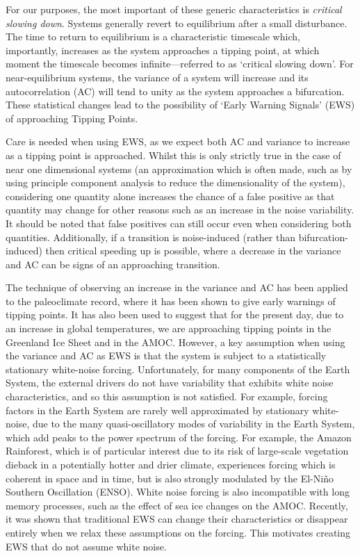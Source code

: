 For our purposes, the most important of these generic characteristics
is \emph{critical slowing down}. Systems generally revert to  equilibrium after a small disturbance. 
The time to return to equilibrium is a characteristic timescale which, importantly, increases as the system 
approaches a tipping point, at which moment the timescale becomes 
infinite\cite{Scheffer2012}---referred to as `critical slowing down'. 
For near-equilibrium systems, the variance of a system will increase and its autocorrelation (AC)
will tend to unity as the system approaches a bifurcation\cite{Scheffer2009,Held2004}.
These statistical changes lead to the possibility of `Early Warning Signals' (EWS) of approaching Tipping Points.

Care is needed when using EWS, as we 
expect both AC and variance to increase as a tipping point is 
approached\cite{Ditlevsen2010}. Whilst this is only strictly true
in the case of near one dimensional systems (an approximation which is often made, such as by using principle component analysis to reduce the 
dimensionality of the system\cite{Held2004}), considering one quantity alone 
increases the chance of a false positive as that quantity may change for other reasons such as an increase in the noise variability. It should 
be noted that false positives can still occur even when considering 
both quantities.
Additionally, if a transition is noise-induced (rather than bifurcation-induced) then critical speeding up is possible, where
a decrease in the variance and AC can be signs of an approaching transition\cite{Titus2020}.

The technique of observing an increase in the variance and
AC has been applied to the paleoclimate record, where it has been shown to give early
warnings of tipping points\cite{Boers2018a}. It has also been used to 
suggest that for the present day, due to an increase in global temperatures, we are approaching tipping points in 
the Greenland Ice Sheet\cite{Boers2021} and in the AMOC\cite{Boers2021a}.	
However, a key assumption when using the variance and AC as EWS is that the system is subject to a statistically stationary white-noise forcing. Unfortunately, for many
components of the Earth System, the external drivers do not have variability that exhibits white noise characteristics, and
so this assumption is not satisfied. For example, forcing factors in the Earth System are rarely well approximated by stationary white-noise, due to the many quasi-oscillatory modes
of variability in the Earth System\cite{VonderHeydt2021}, which add peaks
to the power spectrum of the forcing. For example, the Amazon
Rainforest, which is of particular interest due to its risk of large-scale vegetation dieback in a potentially hotter and drier
climate, experiences
forcing which is coherent in space and in time, but is also strongly modulated by the
El-Ni\~{n}o Southern Oscillation (ENSO)\cite{Jimenez-Munoz2016}.
White noise forcing is also incompatible with
long memory processes\cite{Hurst1957}, such as the effect of sea ice changes on the AMOC\cite{Kuehn2021}. Recently, it was shown\cite{Kuehn2021}
that traditional EWS  can change their characteristics or disappear entirely when we relax these assumptions on the forcing. This motivates creating EWS that do not assume white noise.


